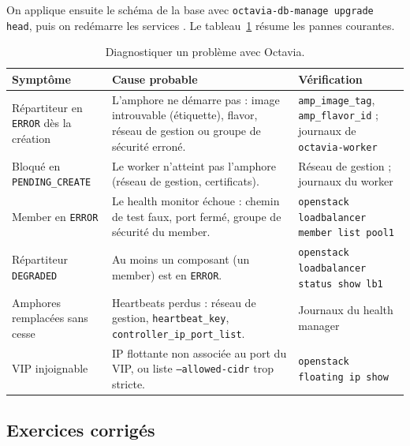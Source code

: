 On applique ensuite le schéma de la base avec \texttt{octavia-db-manage upgrade head}, puis on redémarre les services
\parencite{octavia-install}. Le tableau~\ref{tab:oc-pannes} résume les pannes courantes.

\begin{table}[!ht]
\centering
\renewcommand{\arraystretch}{1.3}
\begin{tabular}{@{}>{\raggedright\arraybackslash}p{4.4cm}>{\raggedright\arraybackslash}p{5.8cm}>{\raggedright\arraybackslash}p{5.3cm}@{}}
\toprule
\textbf{Symptôme} & \textbf{Cause probable} & \textbf{Vérification} \\
\midrule
Répartiteur en \texttt{ERROR} dès la création & L'amphore ne démarre pas : image introuvable (étiquette), flavor, réseau de gestion ou groupe de sécurité erroné. & \texttt{amp\_\allowbreak image\_\allowbreak tag}, \texttt{amp\_\allowbreak flavor\_\allowbreak id} ; journaux de \texttt{octavia-worker} \\
Bloqué en \texttt{PENDING\_\allowbreak CREATE} & Le worker n'atteint pas l'amphore (réseau de gestion, certificats). & Réseau de gestion ; journaux du worker \\
Member en \texttt{ERROR} & Le health monitor échoue : chemin de test faux, port fermé, groupe de sécurité du member. & \texttt{openstack loadbalancer member list pool1} \\
Répartiteur \texttt{DEGRADED} & Au moins un composant (un member) est en \texttt{ERROR}. & \texttt{openstack loadbalancer status show lb1} \\
Amphores remplacées sans cesse & Heartbeats perdus : réseau de gestion, \texttt{heartbeat\_\allowbreak key}, \texttt{controller\_\allowbreak ip\_\allowbreak port\_\allowbreak list}. & Journaux du health manager \\
VIP injoignable & IP flottante non associée au port du VIP, ou liste \texttt{--allowed-cidr} trop stricte. & \texttt{openstack floating ip show} \\
\bottomrule
\end{tabular}
\caption{Diagnostiquer un problème avec Octavia.}
\label{tab:oc-pannes}
\end{table}

\clearpage
\subsection{Exercices corrigés}\label{sec:oc-exercices}

